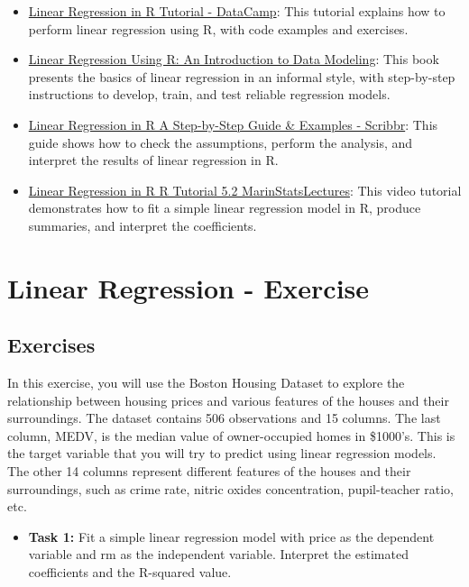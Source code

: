 \documentclass[
]{book}
\providecommand{\tightlist}{%
  \setlength{\itemsep}{0pt}\setlength{\parskip}{0pt}}
\begin{document}
\begin{itemize}
\tightlist
\item
  \href{https://www.datacamp.com/tutorial/linear-regression-R}{Linear Regression in R Tutorial - DataCamp}: This tutorial explains how to perform linear regression using R, with code examples and exercises.
\item
  \href{https://open.umn.edu/opentextbooks/textbooks/399}{Linear Regression Using R: An Introduction to Data Modeling}: This book presents the basics of linear regression in an informal style, with step-by-step instructions to develop, train, and test reliable regression models.
\item
  \href{https://www.scribbr.com/statistics/linear-regression-in-r/}{Linear Regression in R \textbar{} A Step-by-Step Guide \& Examples - Scribbr}: This guide shows how to check the assumptions, perform the analysis, and interpret the results of linear regression in R.
\item
  \href{https://www.r-bloggers.com/2021/10/multiple-linear-regression-made-simple/}{Linear Regression in R \textbar{} R Tutorial 5.2 \textbar{} MarinStatsLectures}: This video tutorial demonstrates how to fit a simple linear regression model in R, produce summaries, and interpret the coefficients.
\end{itemize}

\hypertarget{lin-e}{%
\chapter{Linear Regression - Exercise}\label{lin-e}}

\hypertarget{exercises}{%
\section{Exercises}\label{exercises}}

In this exercise, you will use the Boston Housing Dataset to explore the relationship between housing prices and various features of the houses and their surroundings. The dataset contains 506 observations and 15 columns. The last column, MEDV, is the median value of owner-occupied homes in \$1000's. This is the target variable that you will try to predict using linear regression models. The other 14 columns represent different features of the houses and their surroundings, such as crime rate, nitric oxides concentration, pupil-teacher ratio, etc.

\begin{itemize}
\tightlist
\item
  \textbf{Task 1:} Fit a simple linear regression model with price as the dependent variable and rm as the independent variable. Interpret the estimated coefficients and the R-squared value.
\end{itemize}
\end{document}
